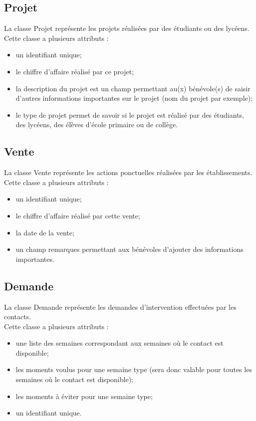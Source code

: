 \documentclass[asi, sansVersion]{picInsa}
\begin{document}
\subsection*{Projet}
La classe Projet représente les projets réalisées par des étudiants ou des lycéens.\\
Cette classe a plusieurs attributs : 
\begin{itemize}
\item un identifiant unique;
\item le chiffre d'affaire réalisé par ce projet;
\item la description du projet est un champ permettant au(x) bénévole(s) de saisir d'autres informations importantes sur le projet (nom du projet par exemple);
\item le type de projet permet de savoir si le projet est réalisé par des étudiants, des lycéens, des élèves d'école primaire ou de collège.
\end{itemize}

\subsection*{Vente}
La classe Vente représente les actions ponctuelles réalisées par les établissements.\\ 
Cette classe a plusieurs attributs : 
\begin{itemize}
\item un identifiant unique; 
\item le chiffre d'affaire réalisé par cette vente;
\item la date de la vente;
\item un champ remarques permettant aux bénévoles d'ajouter des informations importantes. 
\end{itemize}

\subsection*{Demande}

La classe Demande représente les demandes d'intervention effectuées par les contacts.\\
Cette classe a plusieurs attributs :
\begin{itemize}
\item une liste des semaines correspondant aux semaines où le contact est disponible; 
\item les moments voulus pour une semaine type (sera donc valable pour toutes les semaines où le contact est disponible);
\item les moments à éviter pour une semaine type;
\item un identifiant unique.
\end{itemize}
\end{document}
